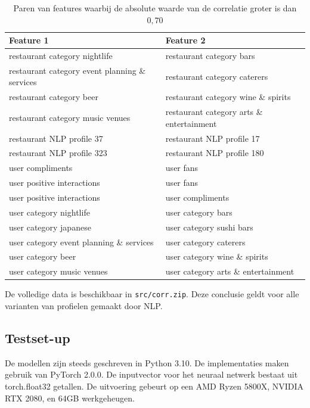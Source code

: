 \begin{table}[H]
    \centering
    \begin{tabular}{l|l}
    Feature 1 & Feature 2 \\ \hline
    restaurant category nightlife & restaurant category bars \\
    restaurant category event planning \& services & restaurant category caterers \\
    restaurant category beer & restaurant category wine \& spirits \\
    restaurant category music venues & restaurant category arts \& entertainment \\
    restaurant NLP profile 37 & restaurant NLP profile 17 \\
    restaurant NLP profile 323 & restaurant NLP profile 180 \\
    user compliments & user fans \\
    user positive interactions & user fans \\
    user positive interactions & user compliments \\
    user category nightlife & user category bars \\
    user category japanese & user category sushi bars \\
    user category event planning \& services & user category caterers \\
    user category beer & user category wine \& spirits \\
    user category music venues & user category arts \& entertainment \\
    \end{tabular}
    \caption{Paren van features waarbij de absolute waarde van de correlatie groter is dan $0,70$}
    \label{}
\end{table}

De volledige data is beschikbaar in \verb|src/corr.zip|. Deze conclusie geldt voor alle varianten van profielen gemaakt door NLP.

\subsection{Testset-up}
De modellen zijn steeds geschreven in Python 3.10. De implementaties maken gebruik van PyTorch 2.0.0. \cite{pytorch} De inputvector voor het neuraal netwerk bestaat uit \verb||torch.float32 getallen. De uitvoering gebeurt op een AMD Ryzen 5800X, NVIDIA RTX 2080, en 64GB werkgeheugen. %

